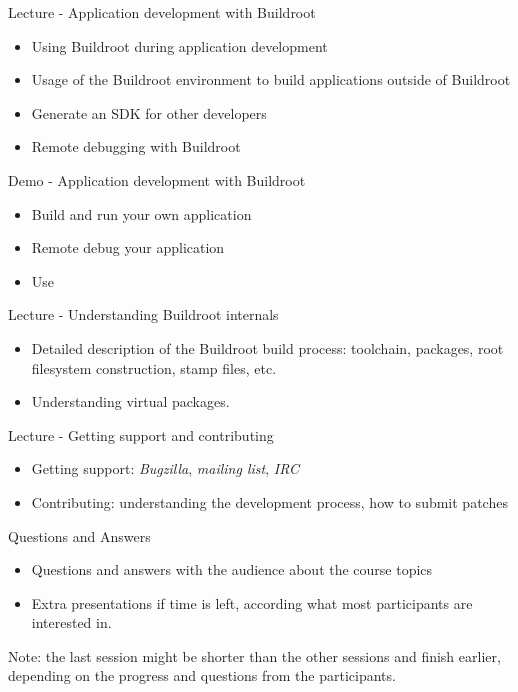 \documentclass[a4paper,12pt,obeyspaces,spaces,hyphens]{article}
\begin{document}
\feagendatwocolumn
{Lecture - Application development with Buildroot}
{
  \begin{itemize}
  \item Using Buildroot during application development
  \item Usage of the Buildroot environment to build applications
    outside of Buildroot
  \item Generate an SDK for other developers
  \item Remote debugging with Buildroot
  \end{itemize}
}
{Demo - Application development with Buildroot}
{
  \begin{itemize}
  \item Build and run your own application
  \item Remote debug your application
  \item Use 
  \end{itemize}
}

\feagendatwocolumn
{Lecture - Understanding Buildroot internals}
{
  \begin{itemize}
  \item Detailed description of the Buildroot build process:
    toolchain, packages, root filesystem construction, stamp files,
    etc.
  \item Understanding virtual packages.
  \end{itemize}
}
{Lecture - Getting support and contributing}
{
  \begin{itemize}
  \item Getting support: {\em Bugzilla}, {\em mailing list}, {\em IRC}
  \item Contributing: understanding the development process, how to
    submit patches
  \end{itemize}
}

\feagendaonecolumn
{Questions and Answers}
{
  \begin{itemize}
  \item Questions and answers with the audience about the course topics
  \item Extra presentations if time is left, according what most
        participants are interested in.
  \end{itemize}
}

Note: the last session might be shorter than the other sessions and
finish earlier, depending on the progress and questions from the
participants.
\end{document}
